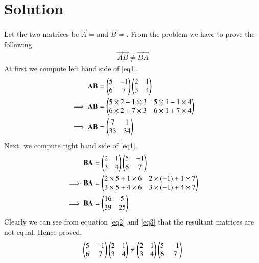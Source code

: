 \documentclass[journal,12pt,twocolumn]{IEEEtran}
\begin{document}
\section{\textbf{Solution}}
Let the two matrices be $\vec{A}$ =  and $\vec{B}$ = . From the problem we have to prove the following
\begin{align}\label{eq1}
\vec{A}\vec{B} \not= \vec{B}\vec{A}
\end{align}
At first we compute left hand side of \ref{eq1}.
\begin{align}
\mathbf{A}\mathbf{B} &= \begin{pmatrix}5 & -1\\6 & 7\end{pmatrix}\begin{pmatrix}2 & 1\\3 & 4\end{pmatrix}\label{eqm1}\\
\implies \mathbf{A}\mathbf{B} &= \begin{pmatrix}5\times2-1\times3 & 5\times1-1\times4\\6\times2+7\times3 & 6\times1+7\times4\end{pmatrix}\\
\implies\mathbf{A}\mathbf{B} &= \begin{pmatrix}7 & 1\\33 & 34\end{pmatrix}\label{eq2}
\end{align}
Next, we compute right hand side of \ref{eq1}.
\begin{align}
\mathbf{B}\mathbf{A} &= \begin{pmatrix}2 & 1\\3 & 4\end{pmatrix}\begin{pmatrix}5 & -1\\6 & 7\end{pmatrix}\\
\implies \mathbf{B}\mathbf{A} &= \begin{pmatrix}2\times5+1\times6 & 2\times(-1)+1\times7\\3\times5+4\times6 & 3\times(-1)+4\times7\end{pmatrix}\\
\implies\mathbf{B}\mathbf{A} &= \begin{pmatrix}16 & 5\\39 & 25\end{pmatrix}\label{eq3}
\end{align}
Clearly we can see from equation \ref{eq2} and \ref{eq3} that the resultant matrices are not equal. Hence proved,
\begin{align*}
\begin{pmatrix}5 & -1\\6 & 7\end{pmatrix}\begin{pmatrix}2 & 1\\3 & 4\end{pmatrix} \not= \begin{pmatrix}2 & 1\\3 & 4\end{pmatrix}\begin{pmatrix}5 & -1\\6 & 7\end{pmatrix}
\end{align*}
\end{document}
